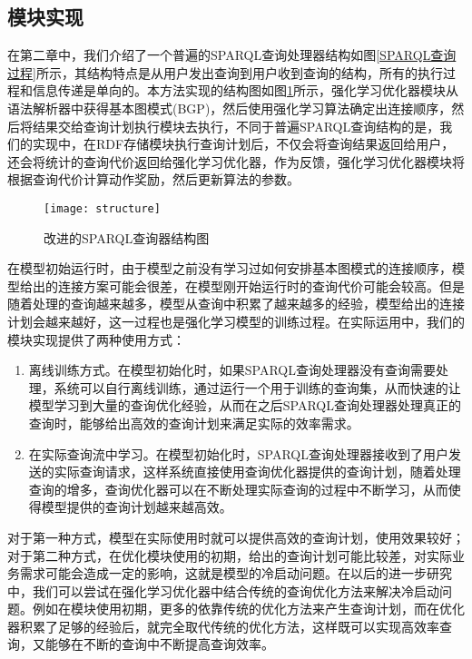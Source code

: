 \subsection{模块实现}
在第二章中，我们介绍了一个普遍的SPARQL查询处理器结构如图\ref{SPARQL查询过程}所示，其结构特点是从用户发出查询到用户收到查询的结构，所有的执行过程和信息传递是单向的。本方法实现的结构图如图\ref{structure}所示，强化学习优化器模块从语法解析器中获得基本图模式(BGP)，然后使用强化学习算法确定出连接顺序，然后将结果交给查询计划执行模块去执行，不同于普遍SPARQL查询结构的是，我们的实现中，在RDF存储模块执行查询计划后，不仅会将查询结果返回给用户，还会将统计的查询代价返回给强化学习优化器，作为反馈，强化学习优化器模块将根据查询代价计算动作奖励，然后更新算法的参数。

\begin{figure}[h]
    \centering
    \texttt{[image: structure]}
    \caption{改进的SPARQL查询器结构图}
    \label{structure}
\end{figure}

在模型初始运行时，由于模型之前没有学习过如何安排基本图模式的连接顺序，模型给出的连接方案可能会很差，在模型刚开始运行时的查询代价可能会较高。但是随着处理的查询越来越多，模型从查询中积累了越来越多的经验，模型给出的连接计划会越来越好，这一过程也是强化学习模型的训练过程。在实际运用中，我们的模块实现提供了两种使用方式：
\begin{enumerate}
    \item 离线训练方式。在模型初始化时，如果SPARQL查询处理器没有查询需要处理，系统可以自行离线训练，通过运行一个用于训练的查询集，从而快速的让模型学习到大量的查询优化经验，从而在之后SPARQL查询处理器处理真正的查询时，能够给出高效的查询计划来满足实际的效率需求。
    \item 在实际查询流中学习。在模型初始化时，SPARQL查询处理器接收到了用户发送的实际查询请求，这样系统直接使用查询优化器提供的查询计划，随着处理查询的增多，查询优化器可以在不断处理实际查询的过程中不断学习，从而使得模型提供的查询计划越来越高效。
\end{enumerate}

对于第一种方式，模型在实际使用时就可以提供高效的查询计划，使用效果较好；对于第二种方式，在优化模块使用的初期，给出的查询计划可能比较差，对实际业务需求可能会造成一定的影响，这就是模型的冷启动问题。在以后的进一步研究中，我们可以尝试在强化学习优化器中结合传统的查询优化方法来解决冷启动问题。例如在模块使用初期，更多的依靠传统的优化方法来产生查询计划，而在优化器积累了足够的经验后，就完全取代传统的优化方法，这样既可以实现高效率查询，又能够在不断的查询中不断提高查询效率。

